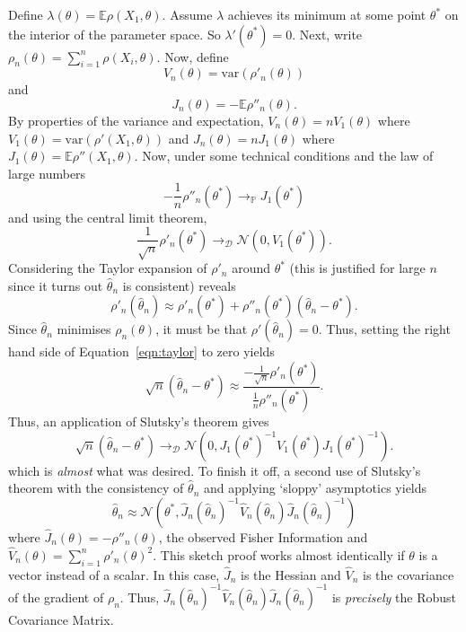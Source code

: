 Define $\lambda(\theta) = \mathbb{E} \rho(X_1, \theta)$. Assume $\lambda$ achieves its minimum at some point $\theta^*$ on the interior of the parameter space. So $\lambda'(\theta^*) = 0$. Next, write $\rho_n(\theta) = \sum_{i=1}^n \rho(X_i, \theta)$. Now, define
\begin{equation}
    V_n(\theta) = \text{var}(\rho'_n(\theta))
\end{equation}
and
\begin{equation}
    J_n(\theta) = -\mathbb{E}\rho''_n(\theta).
\end{equation}
By properties of the variance and expectation, $V_n(\theta) = nV_1(\theta)$ where $V_1(\theta) = \text{var}(\rho'(X_1, \theta))$ and  $J_n(\theta) = nJ_1(\theta)$ where $J_1(\theta) = \mathbb{E}\rho''(X_1, \theta)$. Now, under some technical conditions and the law of large numbers
\begin{equation}
    -\frac{1}{n}\rho''_n(\theta^*) \to_\mathbb{P} J_1(\theta^*)
\end{equation}
and using the central limit theorem,
\begin{equation}
    \frac{1}{\sqrt{n}} \rho'_n(\theta^*) \to_\mathcal{D} \mathcal{N}(0, V_1(\theta^*)).
\end{equation}
Considering the Taylor expansion of $\rho'_n$ around $\theta^*$ (this is justified for large $n$ since it turns out $\hat{\theta}_n$ is consistent) reveals
\begin{equation}
    \label{eqn:taylor}
    \rho'_n(\hat{\theta}_n) \approx \rho'_n(\theta^*) + \rho''_n(\theta^*)(\hat{\theta}_n - \theta^*).
\end{equation}
Since $\hat{\theta}_n$ minimises $\rho_n(\theta)$, it must be that $\rho'(\hat{\theta}_n) = 0$. Thus, setting the right hand side of Equation~\ref{eqn:taylor} to zero yields
\begin{equation}
    \sqrt{n}(\hat{\theta}_n - \theta^*) \approx \frac{-\frac{1}{\sqrt{n}}\rho'_n(\theta^*)}{\frac{1}{n}\rho''_n(\theta^*)}.
\end{equation}
Thus, an application of Slutsky's theorem gives
\begin{equation}
    \sqrt{n}(\hat{\theta}_n - \theta^*) \to_\mathcal{D} \mathcal{N}(0, J_1(\theta^*)^{-1} V_1(\theta^*) J_1(\theta^*)^{-1}).
\end{equation}
which is \emph{almost} what was desired. To finish it off, a second use of Slutsky's theorem with the consistency of $\hat{\theta}_n$ and applying `sloppy' asymptotics yields
\begin{equation}
    \hat{\theta}_n \approx \mathcal{N}(\theta^*, \hat{J}_n(\hat{\theta}_n)^{-1} \hat{V}_n(\hat{\theta}_n) \hat{J}_n(\hat{\theta}_n)^{-1})
\end{equation}
where $\hat{J}_n(\theta) = - \rho''_n(\theta)$, the observed Fisher Information and $\hat{V}_n(\theta) = \sum_{i=1}^n \rho'_n(\theta)^2$.
This sketch proof works almost identically if $\theta$ is a vector instead of a scalar. In this case, $\hat{J}_n$ is the Hessian and $\hat{V}_n$ is the covariance of the gradient of  $\rho_n$. Thus, $\hat{J}_n(\hat{\theta}_n)^{-1} \hat{V}_n(\hat{\theta}_n) \hat{J}_n(\hat{\theta}_n)^{-1}$ is \emph{precisely} the Robust Covariance Matrix.

